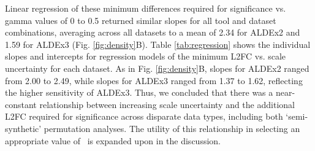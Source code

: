 \documentclass[10pt,letterpaper]{article}
\begin{document}
Linear regression of these minimum differences required for significance vs. gamma values of 0 to 0.5 returned similar slopes for all tool and dataset combinations, averaging across all datasets to a mean of 2.34 for ALDEx2 and 1.59 for ALDEx3 (Fig. \ref{fig:density}B). Table \ref{tab:regression} shows the individual slopes and intercepts for regression models of the minimum L2FC vs. scale uncertainty for each dataset. As in Fig. \ref{fig:density}B, slopes for ALDEx2 ranged from 2.00 to 2.49, while slopes for ALDEx3 ranged from 1.37 to 1.62, reflecting the higher sensitivity of ALDEx3. Thus, we concluded that there was a near-constant relationship between increasing scale uncertainty and the additional L2FC required for significance across disparate data types, including both `semi-synthetic' permutation analyses. The utility of this relationship in selecting an appropriate value of \textgamma~is expanded upon in the discussion.
\end{document}
